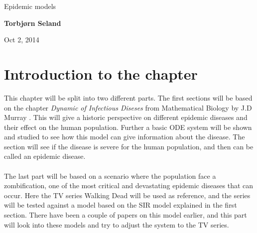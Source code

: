 \documentclass[%
twoside,                 %
final,                   %
10pt]{article}
\begin{document}




\thispagestyle{empty}

\begin{center}
{\LARGE\bf
\begin{spacing}{1.25}
Epidemic models
\end{spacing}
}
\end{center}


\begin{center}
{\bf Torbjørn Seland${}^{}$} \\ [0mm]
\end{center}

    \begin{center}
\end{center}


\begin{center}
Oct 2, 2014
\end{center}

\vspace{1cm}


\tableofcontents


\vspace{1cm} %



\newcommand{\Imax}{I_{\textrm{max}}}
\section{Introduction to the chapter}
This chapter will be split into two different parts. The first sections will be based on the chapter \emph{Dynamic of Infectious Diseses} from Mathematical Biology by J.D Murray \cite{murray2002mathematical}. This will give a historic perspective on different epidemic diseases and their effect on the human population. Further a basic ODE system will be shown and studied to see how this model can give information about the disease. The section will see if the disease is severe for the human population, and then can be called an epidemic disease.
\\
\\
The last part will be based on a scenario where the population face a zombification, one of the most critical and devastating epidemic diseases that can occur. Here the TV series Walking Dead will be used as reference, and the series will be tested against a model based on the SIR model explained in the first section. There have been a couple of papers on this model earlier, and this part will look into these models and try to adjust the system to the TV series.     
\end{document}
